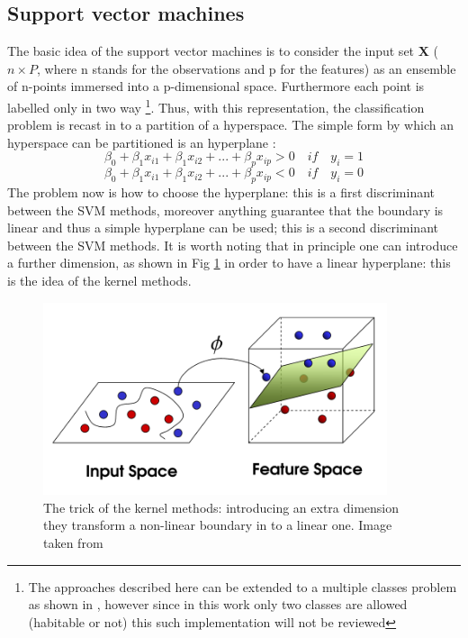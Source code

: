 \documentclass[
12pt, %
a4paper, %
oneside, %
headinclude,footinclude, %
BCOR5mm, %
]{scrartcl}
\begin{document}
\clearpage
\subsection{Support vector machines}
The basic idea of the support vector machines is to consider the input set \textbf{X} ($n\times P$, where n stands for the observations and p for the features) as an ensemble of n-points immersed into a p-dimensional space. Furthermore each point is labelled only in two way \footnote{The approaches described here can be extended to a multiple classes problem as shown in \cite{james2013introduction}, however since in this work only two classes are allowed (habitable or not) this such implementation will not be reviewed}. Thus, with this representation, the classification problem is recast in to a partition of a hyperspace. The simple form by which an hyperspace can be partitioned is an hyperplane \cite{james2013introduction}: 
\begin{equation}
\beta_{0}+\beta_{1}x_{i1}+\beta_{1}x_{i2}+...+\beta_{p}x_{ip} > 0\quad if \quad y_{i}=1
\end{equation}
\begin{equation}
\beta_{0}+\beta_{1}x_{i1}+\beta_{1}x_{i2}+...+\beta_{p}x_{ip} < 0\quad if \quad y_{i}=0
\end{equation}
The problem now is how to choose the hyperplane: this is a first discriminant between the SVM methods, moreover anything guarantee that the boundary is linear and thus a simple hyperplane can be used; this is a second discriminant between the SVM methods. It is worth noting that in principle one can introduce a further dimension, as shown in Fig \ref{Kernel_methods} in order to have a linear hyperplane: this is the idea of the kernel methods\cite{james2013introduction,marsland2015machine}. 
\begin{figure}[h]
\begin{center}
\includegraphics[width=0.9\textwidth]{Pic/kernel_trick.png}
\caption{The trick of the kernel methods: introducing an extra dimension they transform a non-linear boundary in to a linear one. Image taken from \cite{kernel}}
\label{Kernel_methods}
\end{center}
\end{figure}
\end{document}
